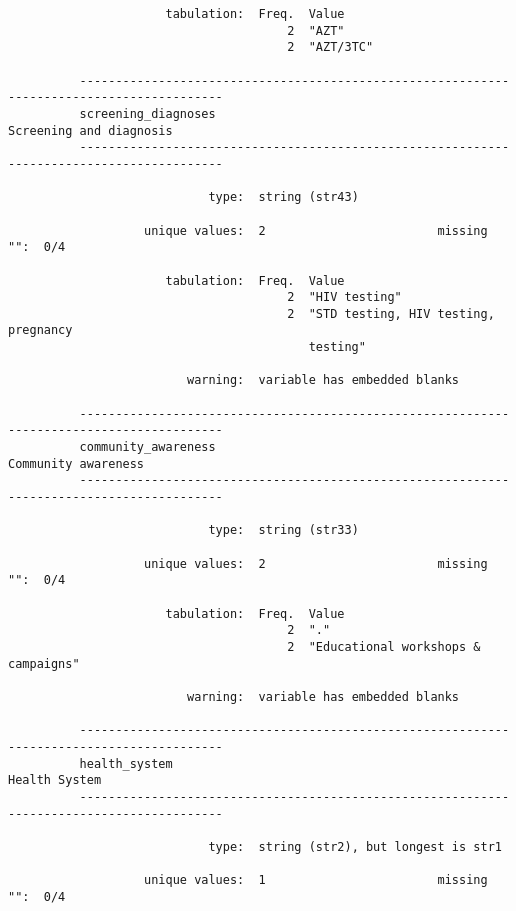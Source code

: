 \documentclass{article}
\begin{document}
\begin{verbatim}
                      tabulation:  Freq.  Value
                                       2  "AZT"
                                       2  "AZT/3TC"
          
          ------------------------------------------------------------------------------------------
          screening_diagnoses                                                Screening and diagnosis
          ------------------------------------------------------------------------------------------
          
                            type:  string (str43)
          
                   unique values:  2                        missing "":  0/4
          
                      tabulation:  Freq.  Value
                                       2  "HIV testing"
                                       2  "STD testing, HIV testing, pregnancy
                                          testing"
          
                         warning:  variable has embedded blanks
          
          ------------------------------------------------------------------------------------------
          community_awareness                                                    Community awareness
          ------------------------------------------------------------------------------------------
          
                            type:  string (str33)
          
                   unique values:  2                        missing "":  0/4
          
                      tabulation:  Freq.  Value
                                       2  "."
                                       2  "Educational workshops & campaigns"
          
                         warning:  variable has embedded blanks
          
          ------------------------------------------------------------------------------------------
          health_system                                                                Health System
          ------------------------------------------------------------------------------------------
          
                            type:  string (str2), but longest is str1
          
                   unique values:  1                        missing "":  0/4
          

\end{verbatim}
\end{document}
